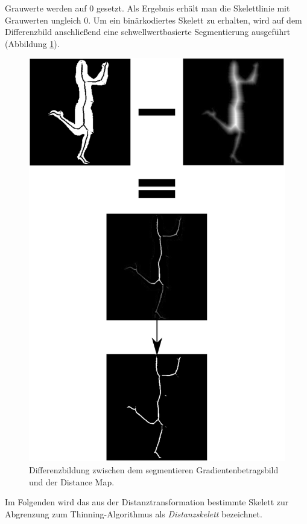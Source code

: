 Grauwerte werden auf $0$ gesetzt. Als Ergebnis erhält man die Skelettlinie mit Grauwerten ungleich $0$. Um ein binärkodiertes Skelett zu erhalten, wird auf dem Differenzbild
anschließend eine schwellwertbasierte Segmentierung ausgeführt (Abbildung \ref{fig:differenzbildung}).
\begin{figure}
\centering
\includegraphics[width=0.8\linewidth]{./fig/differenzbildung}
\caption{Differenzbildung zwischen dem segmentieren Gradientenbetragsbild und der Distance Map.}
\label{fig:differenzbildung}
\end{figure}
Im Folgenden wird das aus der Distanztransformation bestimmte Skelett zur Abgrenzung zum Thinning-Algorithmus als \emph{Distanzskelett} bezeichnet.
\FloatBarrier
\clearpage
